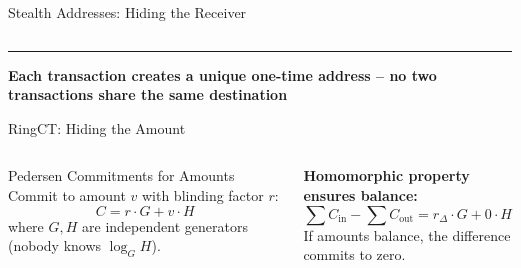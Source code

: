 \documentclass[8pt,aspectratio=169]{beamer}
\newcommand{\bottomnote}[1]{\vfill\vspace{-2mm}\textcolor{mllavender2}{\rule{\textwidth}{0.4pt}}\vspace{1mm}\footnotesize\textbf{#1}}
\begin{document}
\begin{frame}{Stealth Addresses: Hiding the Receiver}
\begin{columns}[T]
\begin{center}
\end{center}
\end{columns}
\bottomnote{Each transaction creates a unique one-time address -- no two transactions share the same destination}
\end{frame}

\begin{frame}{RingCT: Hiding the Amount}
\begin{columns}[T]
\begin{block}{\footnotesize Pedersen Commitments for Amounts}
\footnotesize
Commit to amount $v$ with blinding factor $r$:
$$C = r \cdot G + v \cdot H$$
where $G, H$ are independent generators (nobody knows $\log_G H$).
\end{block}
\vspace{0.1cm}
\footnotesize
\textbf{Homomorphic property ensures balance:}
$$\sum C_{\text{in}} - \sum C_{\text{out}} = r_{\Delta} \cdot G + 0 \cdot H$$
If amounts balance, the difference commits to zero.


\end{columns}
\end{frame}
\end{document}

